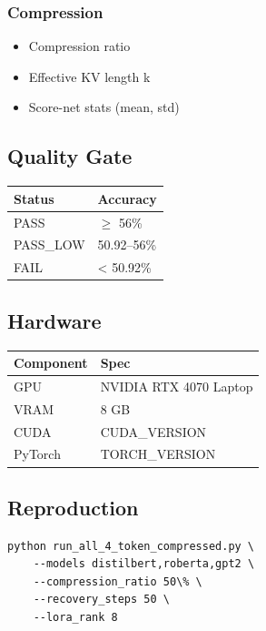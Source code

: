 \subsubsection{Compression}
\begin{itemize}
\item Compression ratio
\item Effective KV length k
\item Score-net stats (mean, std)

\end{itemize}
\subsection{Quality Gate}

\begin{table}[H]
\centering
\small
\begin{tabular}{ll}
\toprule
\textbf{Status} & \textbf{Accuracy} \\
\midrule
PASS & $\ge$ 56\% \\
PASS\_LOW & 50.92--56\% \\
FAIL & < 50.92\% \\
\bottomrule
\end{tabular}
\end{table}

\subsection{Hardware}

\begin{table}[H]
\centering
\small
\begin{tabular}{ll}
\toprule
\textbf{Component} & \textbf{Spec} \\
\midrule
GPU & NVIDIA RTX 4070 Laptop \\
VRAM & 8 GB \\
CUDA & {{CUDA\_VERSION}} \\
PyTorch & {{TORCH\_VERSION}} \\
\bottomrule
\end{tabular}
\end{table}

\subsection{Reproduction}

\begin{lstlisting}
python run_all_4_token_compressed.py \
    --models distilbert,roberta,gpt2 \
    --compression_ratio 50\% \
    --recovery_steps 50 \
    --lora_rank 8
\end{lstlisting}

